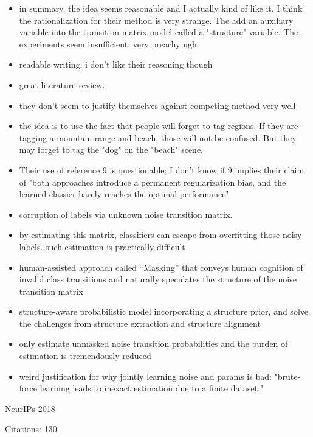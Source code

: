 \documentclass[11pt]{article}
\begin{document}
\begin{itemize}
\item in summary, the idea seems reasonable and I actually kind of like it. I think the rationalization for their method is very strange. The add an auxiliary variable into the transition matrix model called a "structure" variable. The experiments seem insufficient. very preachy ugh
\item readable writing. i don't like their reasoning though
\item great literature review.
\item they don't seem to justify themselves against competing method very well
\item the idea is to use the fact that people will forget to tag regions. If they are tagging a mountain range and beach, those will not be confused. But they may forget to tag the "dog" on the "beach" scene.
\item Their use of reference 9 is questionable; I don't know if 9 implies their claim of "both approaches introduce a permanent regularization
bias, and the learned classier barely reaches the optimal performance"
\item corruption of labels via unknown noise transition matrix.
\item by estimating this matrix, classifiers can escape from overfitting those noisy labels. such estimation is practically difficult
\item human-assisted approach called “Masking” that conveys human cognition of invalid class transitions and naturally speculates the structure of the noise transition matrix
\item structure-aware probabilistic model incorporating a structure prior, and solve the challenges from structure extraction and structure alignment
\item only estimate unmasked noise transition probabilities and the burden of estimation is tremendously reduced
\item weird justification for why jointly learning noise and params is bad: "brute-force learning leads to inexact estimation due to a finite dataset."
\end{itemize}

\vspace{2cm}

\noindent NeurIPs 2018

\noindent Citations: 130
\end{document}
